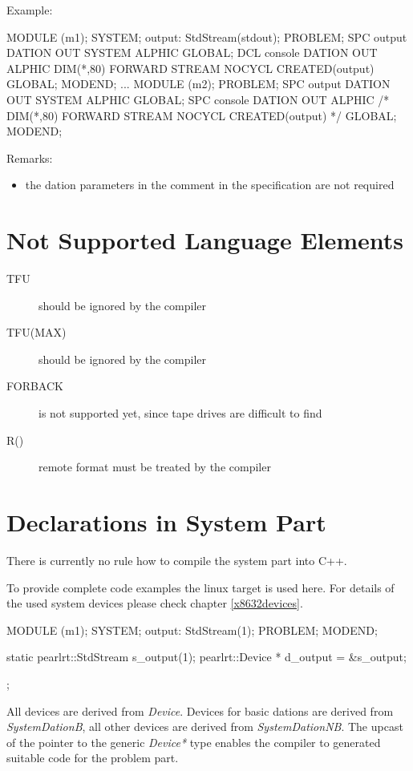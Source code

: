 Example:
\begin{PEARLCode}
MODULE (m1);
SYSTEM;
   output: StdStream(stdout);
PROBLEM;
   SPC output  DATION OUT SYSTEM ALPHIC GLOBAL;
   DCL console DATION OUT ALPHIC DIM(*,80) FORWARD STREAM NOCYCL CREATED(output) GLOBAL;
MODEND;
...
MODULE (m2);
PROBLEM;
   SPC output  DATION OUT SYSTEM ALPHIC GLOBAL;
   SPC console DATION OUT ALPHIC /* DIM(*,80) FORWARD STREAM NOCYCL CREATED(output) */ GLOBAL;
MODEND;
\end{PEARLCode}

Remarks:
\begin{itemize}
\item the dation parameters in the comment in the specification
   are not required 
\end{itemize}

\section{Not Supported Language Elements}
\begin{description}
\item[TFU] should be ignored by the compiler
\item[TFU(MAX)] should be ignored by the compiler
\item[FORBACK] is not supported yet, since tape drives are
   difficult to find
\item[R()] remote format must be treated by the compiler
\end{description}

\section{Declarations in System Part}
There is currently no rule how to compile the system part into C++.

To provide complete code examples the linux target is used here.
For details of the used system devices please check chapter \ref{x8632devices}.

\begin{PEARLCode}
MODULE (m1);
SYSTEM;
   output: StdStream(1);
PROBLEM;
MODEND;
\end{PEARLCode}

\begin{CppCode}
static pearlrt::StdStream s_output(1);
       pearlrt::Device * d_output = &s_output;
\end{CppCode};

All devices are derived from {\em Device}.
Devices for basic dations are derived from {\em SystemDationB},
all other devices are derived from {\em SystemDationNB}.
The upcast of the pointer
to the generic {\em Device*} type enables the compiler to generated 
suitable code for the problem part.

